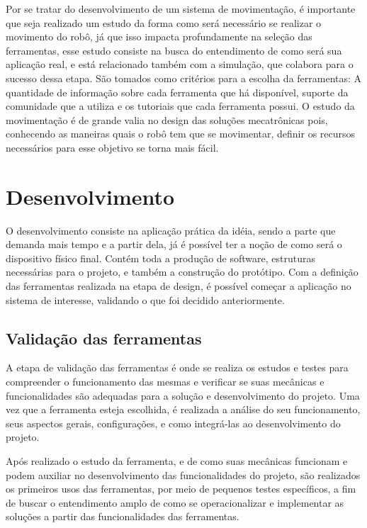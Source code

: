Por se tratar do desenvolvimento de um sistema de movimentação, é importante que seja realizado um estudo da forma como será necessário se realizar o movimento do robô, já que isso impacta profundamente na seleção das ferramentas, esse estudo consiste na busca do entendimento de como será sua aplicação real, e está relacionado também com a simulação, que colabora para o sucesso dessa etapa. São tomados como critérios para a escolha da ferramentas: A quantidade de informação sobre cada ferramenta que há disponível, suporte da comunidade que a utiliza e os tutoriais que cada ferramenta possui. O estudo da movimentação é de grande valia no design das soluções mecatrônicas pois, conhecendo as maneiras quais o robô tem que se movimentar, definir os recursos necessários para esse objetivo se torna mais fácil.

\section{Desenvolvimento}
\label{sec:Desen}
O desenvolvimento consiste na aplicação prática da idéia, sendo a parte que demanda mais tempo e a partir dela, já é possível ter a noção de como será o dispositivo físico final. Contém toda a produção de software, estruturas necessárias para o projeto, e também a construção do protótipo. Com a definição das ferramentas realizada na etapa de design, é possível começar a aplicação no sistema de interesse, validando o que foi decidido anteriormente.

\subsection{Validação das ferramentas}
\label{ssec:val_ferra}
A etapa de validação das ferramentas é onde se realiza os estudos e testes para compreender o funcionamento das mesmas e verificar se suas mecânicas e funcionalidades são adequadas para a solução e desenvolvimento do projeto. Uma vez que a ferramenta esteja escolhida, é realizada a análise do seu funcionamento, seus aspectos gerais, configurações, e como integrá-las ao desenvolvimento do projeto.

Após realizado o estudo da ferramenta, e de como suas mecânicas funcionam e podem auxiliar no desenvolvimento das funcionalidades do projeto, são realizados os primeiros usos das ferramentas, por meio de pequenos testes específicos, a fim de buscar o entendimento amplo de como se operacionalizar e implementar as soluções a partir das funcionalidades das ferramentas. 

